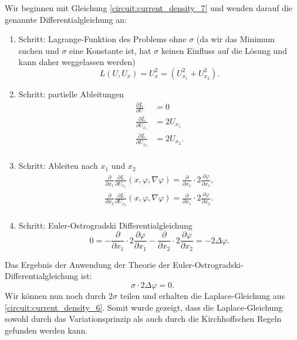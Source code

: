 Wir beginnen mit Gleichung \eqref{circuit:current_density_7} und wenden darauf die genannte Differentialgleichung an:
\begin{enumerate}
	\item Schritt: Lagrange-Funktion des Problems ohne $\sigma$ (da wir das Minimum suchen und $\sigma$ eine Konstante ist, hat $\sigma$ keinen Einfluss auf die Lösung und kann daher weggelassen werden)
	\begin{equation}
		L(U, U_x)= U_x^2 = (U_{x_1}^2+U_{x_2}^2).
	\end{equation}
	\item Schritt: partielle Ableitungen
	\begin{equation}
		\begin{aligned}
			\frac{\partial L}{\partial U}&=0\\
			\frac{\partial L}{\partial U_{x_1}}&=2U_{x_1}\\
			\frac{\partial L}{\partial U_{x_2}}&=2U_{x_2}.\\
		\end{aligned}
	\end{equation}
	\item Schritt: Ableiten nach $x_1$ und $x_2$
	\begin{equation}
		\begin{aligned}
			\frac{\partial}{\partial x_1}\frac{\partial L}{\partial U_{x_1}}(x,\varphi,\nabla \varphi)= \frac{\partial}{\partial x_1}\cdot 2\frac{\partial \varphi}{\partial {x_1}},\\
			\frac{\partial}{\partial x_2}\frac{\partial L}{\partial U_{x_2}}(x,\varphi,\nabla \varphi)= \frac{\partial}{\partial x_1}\cdot 2\frac{\partial \varphi}{\partial {x_2}} .\\
		\end{aligned}
	\end{equation}
	\item Schritt: Euler-Ostrogradski Differentialgleichung
	\begin{equation}
		0=-\frac{\partial}{\partial x_1}\cdot 2\frac{\partial \varphi}{\partial {x_1}}-\frac{\partial}{\partial x_2}\cdot 2\frac{\partial \varphi}{\partial {x_2}}=-2\Delta\varphi.
	\end{equation}
\end{enumerate}

Das Ergebnis der Anwendung der Theorie der
Euler-Ostrogradski-Differentialgleichung ist:
\begin{equation}
\sigma \cdot 2\Delta\varphi=0.
\end{equation}
Wir können nun noch durch $2\sigma$ teilen und erhalten die
Laplace-Gleichung aus \eqref{circuit:current_density_6}. Somit wurde
gezeigt, dass die Laplace-Gleichung sowohl durch das Variationsprinzip
als auch durch die Kirchhoffschen Regeln gefunden werden kann.



